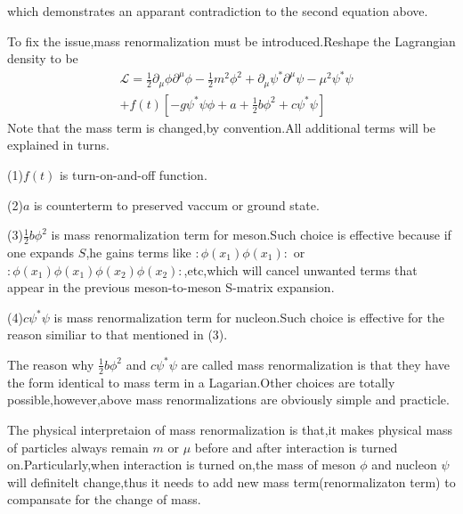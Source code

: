 \documentclass[a4paper]{article}
\begin{document}
which demonstrates an apparant contradiction to the second equation above.
\par To fix the issue,mass renormalization must be introduced.Reshape the Lagrangian density to be
\begin{align*}
	&\mathscr{L}=\frac{1}{2}\partial_{\mu}\phi\partial^{\mu}\phi-\frac{1}{2}m^2\phi^2+\partial_{\mu}\psi^*\partial^{\mu}\psi-\mu^2\psi^*\psi\\
	&+f(t)[-g\psi^*\psi\phi+a+\frac{1}{2}b\phi^2+c\psi^*\psi]
\end{align*}
Note that the mass term is changed,by convention.All additional terms will be explained in turns.
\par (1)$f(t)$ is turn-on-and-off function.
\par (2)$a$ is counterterm to preserved vaccum or ground state.
\par (3)$\frac{1}{2}b\phi^2$ is mass renormalization term for meson.Such choice is effective because if one expands $S$,he gains terms like $:\phi(x_1)\phi(x_1):$ or $:\phi(x_1)\phi(x_1)\phi(x_2)\phi(x_2):$,etc,which will cancel unwanted terms that appear in the previous meson-to-meson S-matrix expansion.
\par (4)$c\psi^*\psi$ is mass renormalization term for nucleon.Such choice is effective for the reason similiar to that mentioned in (3).
\par The reason why $\frac{1}{2}b\phi^2$ and $c\psi^*\psi$ are called mass renormalization is that they have the form identical to mass term in a Lagarian.Other choices are totally possible,however,above mass renormalizations are obviously simple and practicle.
\par The physical interpretaion of mass renormalization is that,it makes physical mass of particles always remain $m$ or $\mu$ before and after interaction is turned on.Particularly,when interaction is turned on,the mass of meson $\phi$ and nucleon $\psi$ will definitelt change,thus it needs to add new mass term(renormalizaton term) to compansate for the change of mass. 
\end{document}
